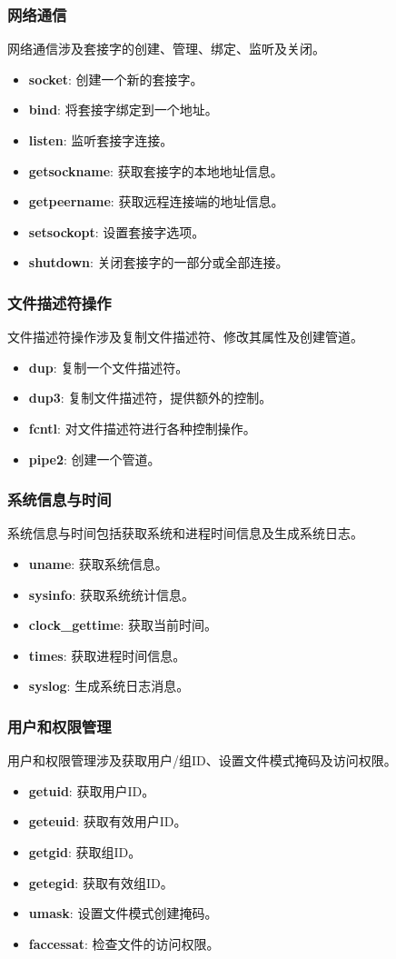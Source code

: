 \subsubsection{网络通信}
网络通信涉及套接字的创建、管理、绑定、监听及关闭。
\begin{itemize}
    \item \textbf{socket}: 创建一个新的套接字。
    \item \textbf{bind}: 将套接字绑定到一个地址。
    \item \textbf{listen}: 监听套接字连接。
    \item \textbf{getsockname}: 获取套接字的本地地址信息。
    \item \textbf{getpeername}: 获取远程连接端的地址信息。
    \item \textbf{setsockopt}: 设置套接字选项。
    \item \textbf{shutdown}: 关闭套接字的一部分或全部连接。
\end{itemize}
\subsubsection{文件描述符操作}
文件描述符操作涉及复制文件描述符、修改其属性及创建管道。
\begin{itemize}
    \item \textbf{dup}: 复制一个文件描述符。
    \item \textbf{dup3}: 复制文件描述符，提供额外的控制。
    \item \textbf{fcntl}: 对文件描述符进行各种控制操作。
    \item \textbf{pipe2}: 创建一个管道。
\end{itemize}
\subsubsection{系统信息与时间}
系统信息与时间包括获取系统和进程时间信息及生成系统日志。
\begin{itemize}
    \item \textbf{uname}: 获取系统信息。
    \item \textbf{sysinfo}: 获取系统统计信息。
    \item \textbf{clock\_gettime}: 获取当前时间。
    \item \textbf{times}: 获取进程时间信息。
    \item \textbf{syslog}: 生成系统日志消息。
\end{itemize}
\subsubsection{用户和权限管理}
用户和权限管理涉及获取用户/组ID、设置文件模式掩码及访问权限。
\begin{itemize}
    \item \textbf{getuid}: 获取用户ID。
    \item \textbf{geteuid}: 获取有效用户ID。
    \item \textbf{getgid}: 获取组ID。
    \item \textbf{getegid}: 获取有效组ID。
    \item \textbf{umask}: 设置文件模式创建掩码。
    \item \textbf{faccessat}: 检查文件的访问权限。
\end{itemize}
